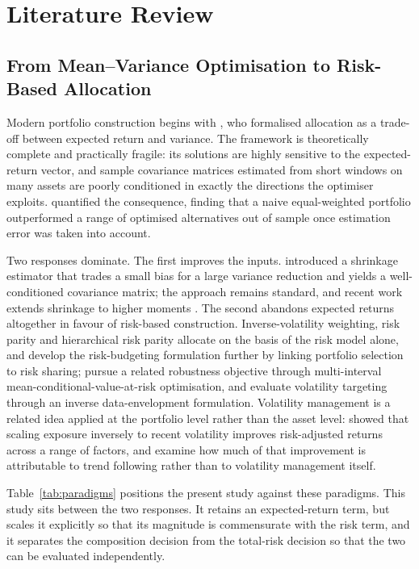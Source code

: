 \section{Literature Review}
\label{sec:lit}

\subsection{From Mean--Variance Optimisation to Risk-Based Allocation}

Modern portfolio construction begins with \citet{markowitz52}, who formalised
allocation as a trade-off between expected return and variance. The framework is
theoretically complete and practically fragile: its solutions are highly sensitive to
the expected-return vector, and sample covariance matrices estimated from short windows
on many assets are poorly conditioned in exactly the directions the optimiser exploits.
\citet{demiguel09} quantified the consequence, finding that a naive equal-weighted
portfolio outperformed a range of optimised alternatives out of sample once estimation
error was taken into account.

Two responses dominate. The first improves the inputs. \citet{ledoit04} introduced a
shrinkage estimator that trades a small bias for a large variance reduction and yields
a well-conditioned covariance matrix; the approach remains standard, and recent work
extends shrinkage to higher moments \citep{lu25}. The second abandons expected returns
altogether in favour of risk-based construction. Inverse-volatility weighting, risk
parity and hierarchical risk parity \citep{prado16} allocate on the basis of the risk
model alone, and \citet{asimit25} develop the risk-budgeting formulation further by
linking portfolio selection to risk sharing; \citet{khodamoradi23} pursue a related
robustness objective through multi-interval mean-conditional-value-at-risk
optimisation, and \citet{kehinde25} evaluate volatility targeting through an inverse
data-envelopment formulation. Volatility management is a related idea
applied at the portfolio level rather than the asset level: \citet{moreira17} showed
that scaling exposure inversely to recent volatility improves risk-adjusted returns
across a range of factors, and \citet{hood25} examine how much of that improvement is
attributable to trend following rather than to volatility management itself.

Table~\ref{tab:paradigms} positions the present study against these paradigms.
This study sits between the two responses. It retains an expected-return term, but
scales it explicitly so that its magnitude is commensurate with the risk term, and it
separates the composition decision from the total-risk decision so that the two can be
evaluated independently.

